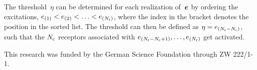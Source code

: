 \documentclass[twocolumn, superscriptaddress]{revtex4}
\newcommand{\Nc}{{N_{\rm c}}}
\newcommand{\Nr}{{N_{\rm r}}}
\begin{document}
The threshold~$\eta$ can be determined for each realization of~$\boldsymbol e$ by ordering the excitations, $e_{(1)} < e_{(2)} < \ldots < e_{(\Nr)}$, where the index in the bracket denotes the position in the sorted list.
The threshold can then be defined as $\eta = e_{(\Nr - \Nc)}$, such that the $\Nc$ receptors associated with $e_{(\Nr - \Nc + 1)}, \ldots, e_{(\Nr)}$ get activated.
 

\begin{acknowledgments}
This research was funded by the German Science Foundation through ZW 222/1-1.
\end{acknowledgments}



\end{document}
